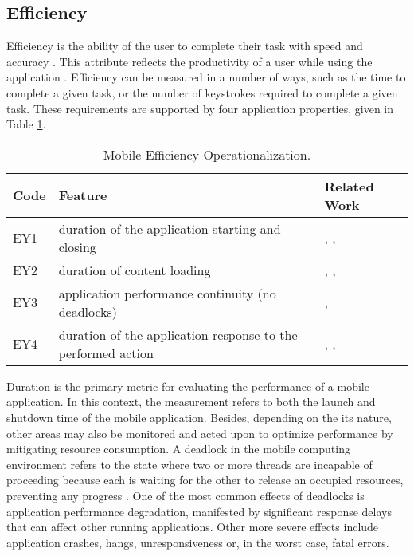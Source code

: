 \documentclass[preprint,12pt]{elsarticle}
\begin{document}
\subsection{Efficiency}
Efficiency is the ability of the user to complete their task with speed and accuracy \cite{nosseir2012mobile, hutahaean2020identifying}. This attribute reflects the productivity of a user while using the application \cite{bevan2008classifying}. Efficiency can be measured in a number of ways, such as the time to complete a given task, or the number of keystrokes required to complete a given task. These requirements are supported by four application properties, given in Table \ref{tab:oper-efficiency}.

\begin{table}[h]
\caption{Mobile Efficiency Operationalization.}
\label{tab:oper-efficiency}
\footnotesize
\begin{tabular}{|l|p{9cm}|p{2.5cm}|}
\hline
\textbf{Code}  & \textbf{Feature}     & \textbf{Related Work} \\ \hline
EY1 & duration of the application starting and closing & \cite{dixon2016usability}, \cite{nam2016user}, \cite{weichbroth2024usabilitya}        \\ \hline
EY2 & duration of content loading   & \cite{barakovic2015multidimensional},   \cite{wang2021effect}, \cite{wang2023waiting}  \\ \hline
EY3 & application performance continuity (no deadlocks) &  \cite{gao2014mobile}, \cite{majrashi2018task}      \\ \hline
EY4 & duration of the application response to the performed action & \cite{von2016usability}, \cite{saleh2017evaluating}, \cite{yu2020unravelling}  \\ \hline
\end{tabular}
\end{table}

Duration is the primary metric for evaluating the performance of a mobile application. In this context, the measurement refers to both the launch and shutdown time of the mobile application. Besides, depending on the its nature, other areas may also be monitored and acted upon to optimize performance by mitigating resource consumption. 
A deadlock in the mobile computing environment refers to the state where two or more threads are incapable of proceeding because each is waiting for the other to release an occupied resources, preventing any progress \cite{Hussain2024}. One of the most common effects of deadlocks is application performance degradation, manifested by significant response delays that can affect other running applications. Other more severe effects include application crashes, hangs, unresponsiveness or, in the worst case, fatal errors. 
\end{document}
